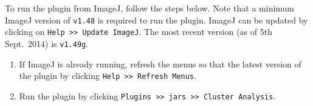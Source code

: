To run the plugin from ImageJ, follow the steps below. Note that a minimum
ImageJ version of \texttt{v1.48} is required to run the plugin. ImageJ can be
updated by clicking on \mbox{\texttt{Help >> Update ImageJ}}. The most recent
version (as of 5th Sept.\ 2014) is \texttt{v1.49g}.
\begin{enumerate}
	\item If ImageJ is already running, refresh the menus so that the latest
		version of the plugin by clicking \texttt{Help >> Refresh Menus}.
	\item Run the plugin by clicking \texttt{Plugins >> jars >> Cluster
		Analysis}.
\end{enumerate}
